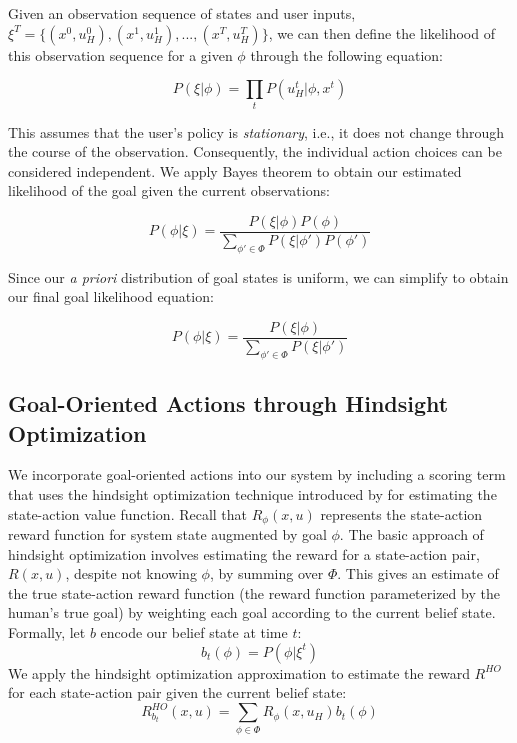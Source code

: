 \documentclass[conference]{IEEEtran}
\begin{document}
Given an observation sequence of states and user inputs, $\xi^T = \{(x^0, u_H^0), (x^1, u_H^1), ..., (x^T, u_H^T)\}$, we can then define the likelihood of this observation sequence for a given $\phi$ through the following equation:

\begin{equation}
P(\xi|\phi) = \prod_tP(u_H^t|\phi, x^t)
\end{equation}

This assumes that the user's policy is \textit{stationary}, i.e., it does not change through the course of the observation. Consequently, the individual action choices can be considered independent. We apply Bayes theorem to obtain our estimated likelihood of the goal given the current observations:

\begin{equation}
P(\phi|\xi) = \frac{P(\xi|\phi)P(\phi)}{\sum_{\phi' \in \Phi}P(\xi|\phi')P(\phi')}
\end{equation}

Since our \textit{a priori} distribution of goal states is uniform, we can simplify to obtain our final goal likelihood equation:

\begin{equation}
P(\phi|\xi) = \frac{P(\xi|\phi)}{\sum_{\phi' \in \Phi}P(\xi|\phi')}
\end{equation}

\subsection{Goal-Oriented Actions through Hindsight Optimization}

We incorporate goal-oriented actions into our system by including a scoring term that uses the hindsight optimization technique introduced by \citet{javdani2015shared} for estimating the state-action value function. Recall that $R_\phi(x, u)$ represents the state-action reward function for system state augmented by goal $\phi$. The basic approach of hindsight optimization involves estimating the reward for a state-action pair, $R(x, u)$, despite not knowing $\phi$, by summing over $\Phi$. This gives an estimate of the true state-action reward function (the reward function parameterized by the human's true goal) by weighting each goal according to the current belief state. Formally, let $b$ encode our belief state at time $t$:
\[
b_t(\phi) = P(\phi|\xi^t)
\]
We apply the hindsight optimization approximation to estimate the reward $R^{HO}$ for each state-action pair given the current belief state:
\begin{equation}
R^{HO}_{b_t}(x,u) = \sum_{\phi \in \Phi} R_\phi (x, u_H)b_t(\phi)
\end{equation}
\end{document}
